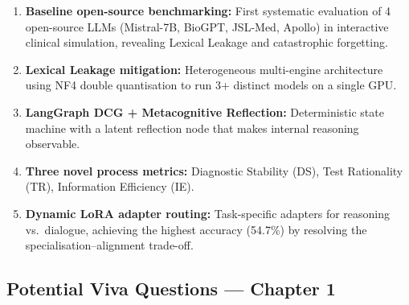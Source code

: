 \begin{enumerate}
    \item \textbf{Baseline open-source benchmarking:} First systematic evaluation of 4 open-source LLMs (Mistral-7B, BioGPT, JSL-Med, Apollo) in interactive clinical simulation, revealing Lexical Leakage and catastrophic forgetting.
    \item \textbf{Lexical Leakage mitigation:} Heterogeneous multi-engine architecture using NF4 double quantisation to run 3+ distinct models on a single GPU.
    \item \textbf{LangGraph DCG + Metacognitive Reflection:} Deterministic state machine with a latent reflection node that makes internal reasoning observable.
    \item \textbf{Three novel process metrics:} Diagnostic Stability (DS), Test Rationality (TR), Information Efficiency (IE).
    \item \textbf{Dynamic LoRA adapter routing:} Task-specific adapters for reasoning vs.\ dialogue, achieving the highest accuracy (54.7\%) by resolving the specialisation--alignment trade-off.
\end{enumerate}

\subsection{Potential Viva Questions --- Chapter 1}

